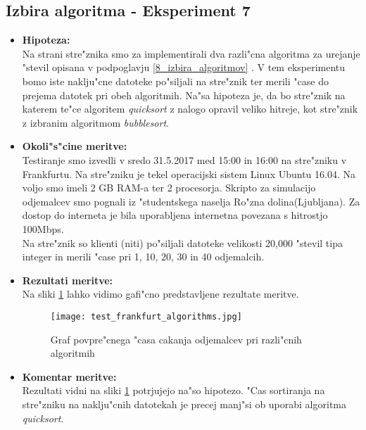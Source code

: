     \subsection{Izbira algoritma - Eksperiment 7}
    \begin{itemize}
    	\item \textbf{Hipoteza: }  \\
    		Na strani stre"znika smo za implementirali dva razli"cna algoritma za urejanje "stevil opisana v podpoglavju \ref{8_izbira_algoritmov} . V tem eksperimentu bomo iste naklju"cne datoteke po"siljali na stre"znik ter merili "case do prejema datotek pri obeh algoritmih.
		Na"sa hipoteza je, da bo stre"znik na katerem te"ce algoritem \textit{quicksort} z nalogo opravil veliko hitreje, kot stre"znik z izbranim algoritmom \textit{bubblesort}.

    	\item \textbf{Okoli"s"cine meritve: } \\
    		Testiranje smo izvedli v sredo 31.5.2017 med 15:00 in 16:00 na stre"zniku v Frankfurtu. Na stre"zniku je tekel operacijski sistem Linux Ubuntu 16.04. Na voljo smo imeli 2 GB RAM-a ter 2 procesorja. Skripto za simulacijo odjemalcev smo pognali iz "studentskega naselja Ro"zna dolina(Ljubljana). Za dostop do interneta je bila uporabljena internetna povezana s hitrostjo 100Mbps.\\ Na stre"znik so klienti (niti) po"siljali datoteke velikosti 20,000 "stevil tipa integer in merili "case pri 1, 10, 20, 30 in 40 odjemalcih.

     	\item \textbf{Rezultati meritve: }  \\
		Na sliki \ref{8_graf_algorithms} lahko vidimo gafi"cno predstavljene rezultate meritve.
    		\begin{figure}[h]
  		\centering
  		  \texttt{[image: test\_frankfurt\_algorithms.jpg]}
  		\caption{Graf povpre"cnega "casa cakanja odjemalcev pri razli"cnih algoritmih }
  		\label{8_graf_algorithms}
		\end{figure}
    		\newpage

    	\item \textbf{Komentar meritve: } \\
    		Rezultati vidni na sliki  \ref{8_graf_algorithms} potrjujejo na"so hipotezo. "Cas sortiranja na stre"zniku na naklju"cnih datotekah je precej manj"si ob uporabi algoritma \textit{quicksort}.
    \end{itemize}


